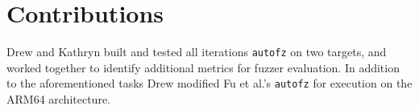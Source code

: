 \section{Contributions}
Drew and Kathryn built and tested all iterations \texttt{autofz} on two targets, 
and worked together to identify additional metrics for fuzzer evaluation. In addition
to the aforementioned tasks Drew modified Fu et al.'s \texttt{autofz} for execution on
the ARM64 architecture. 
